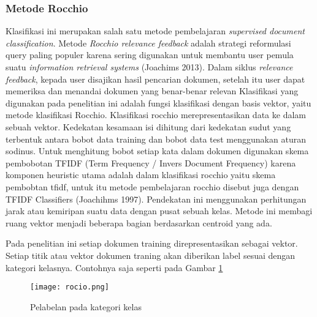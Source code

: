 \subsubsection*{Metode Rocchio}
Klasifikasi ini merupakan salah satu metode pembelajaran \textit{supervised document classification}. Metode \textit{Rocchio relevance feedback} adalah strategi reformulasi query paling populer karena sering digunakan untuk membantu user pemula suatu \textit{information retrieval systems} (Joachims 2013). Dalam siklus \textit{relevance feedback}, kepada user disajikan hasil pencarian dokumen, setelah itu user dapat memeriksa dan menandai dokumen yang benar-benar relevan Klasifikasi yang digunakan pada penelitian ini adalah fungsi klasifikasi dengan basis vektor, yaitu metode klasifikasi Rocchio. Klasifikasi rocchio merepresentasikan data ke dalam sebuah vektor. Kedekatan kesamaan isi dihitung dari kedekatan sudut yang terbentuk antara bobot data training dan bobot data test menggunakan aturan sodinus. Untuk menghitung bobot setiap kata dalam dokumen digunakan skema pembobotan TFIDF (Term Frequency / Invers Document Frequency) karena komponen heuristic utama adalah dalam klasifikasi rocchio yaitu skema pembobtan tfidf, untuk itu metode pembelajaran rocchio disebut juga dengan TFIDF Classifiers (Joachihms 1997). Pendekatan ini menggunakan perhitungan jarak atau kemiripan suatu data dengan pusat sebuah kelas. Metode ini membagi ruang vektor menjadi beberapa bagian berdasarkan centroid yang ada. 

Pada penelitian ini setiap dokumen training direpresentasikan sebagai vektor. Setiap titik atau vektor dokumen traning akan diberikan label sesuai dengan kategori kelasnya. Contohnya saja seperti pada Gambar \ref{fig:rocio} 

\begin{figure}[h!] %
	\centering
	\texttt{[image: rocio.png]}
	\caption{Pelabelan pada kategori kelas}
	\label{fig:rocio}
\end{figure}

